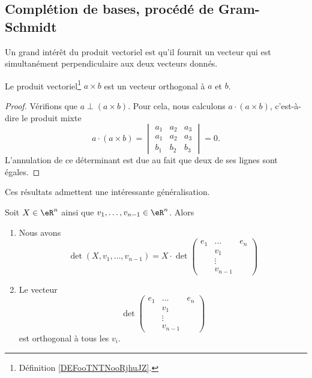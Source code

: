 \subsection{Complétion de bases, procédé de Gram-Schmidt}


Un grand intérêt du produit vectoriel est qu'il fournit un vecteur qui est simultanément perpendiculaire aux deux vecteurs donnés.
\begin{proposition}     \label{PROPooTUVKooOQXKKl}
	Le produit vectoriel\footnote{Définition \ref{DEFooTNTNooRjhuJZ}.} \( a\times b\) est un vecteur orthogonal à \( a\) et \( b\).
\end{proposition}

\begin{proof}
	Vérifions que \( a\perp (a\times b)\). Pour cela, nous calculons \( a\cdot (a\times b)\), c'est-à-dire le produit mixte
	\begin{equation}
		a\cdot(a\times b)=\begin{vmatrix}
			a_1 & a_2 & a_3 \\
			a_1 & a_2 & a_3 \\
			b_1 & b_2 & b_3
		\end{vmatrix}=0.
	\end{equation}
	L'annulation de ce déterminant est due au fait que deux de ses lignes sont égales.
\end{proof}

Ces résultats admettent une intéressante généralisation.
\begin{lemma}       \label{LEMooFRWKooVloCSM}
	Soit \( X\in \eR^n\) ainsi que \( v_1,\ldots, v_{n-1}\in \eR^n\). Alors
	\begin{enumerate}
		\item
		      Nous avons
		      \begin{equation}        \label{EQooMQNPooRHHBjz}
			      \det(X,v_1,\ldots, v_{n-1})=X\cdot
			      \det\begin{pmatrix}
				      e_1 & \ldots  & e_n \\
				          & v_1     &     \\
				          & \vdots  &     \\
				          & v_{n-1} &
			      \end{pmatrix}
		      \end{equation}
		\item
		      Le vecteur
		      \begin{equation}
			      \det\begin{pmatrix}
				      e_1 & \ldots  & e_n \\
				          & v_1     &     \\
				          & \vdots  &     \\
				          & v_{n-1} &
			      \end{pmatrix}
		      \end{equation}
		      est orthogonal à tous les \( v_i\).
	\end{enumerate}
\end{lemma}

